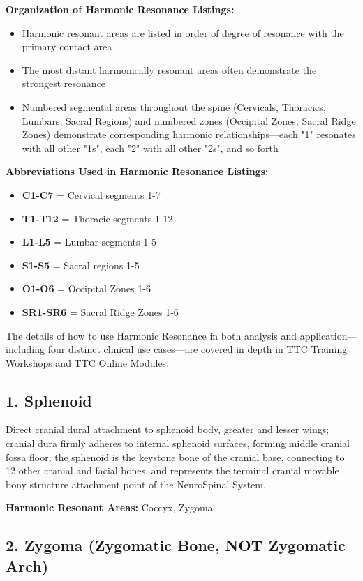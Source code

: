 \documentclass[11pt,letterpaper]{article}
\begin{document}
\textbf{Organization of Harmonic Resonance Listings:}


\begin{itemize}
\item Harmonic resonant areas are listed in order of degree of resonance with the primary contact area
\item The most distant harmonically resonant areas often demonstrate the strongest resonance
\item Numbered segmental areas throughout the spine (Cervicals, Thoracics, Lumbars, Sacral Regions) and numbered zones (Occipital Zones, Sacral Ridge Zones) demonstrate corresponding harmonic relationships—each "1" resonates with all other "1s", each "2" with all other "2s", and so forth
\end{itemize}

\textbf{Abbreviations Used in Harmonic Resonance Listings:}

\begin{itemize}
\item \textbf{C1-C7} = Cervical segments 1-7
\item \textbf{T1-T12} = Thoracic segments 1-12
\item \textbf{L1-L5} = Lumbar segments 1-5
\item \textbf{S1-S5} = Sacral regions 1-5
\item \textbf{O1-O6} = Occipital Zones 1-6
\item \textbf{SR1-SR6} = Sacral Ridge Zones 1-6
\end{itemize}

The details of how to use Harmonic Resonance in both analysis and application—including four distinct clinical use cases—are covered in depth in TTC Training Workshops and TTC Online Modules.


\subsection{1. Sphenoid}

Direct cranial dural attachment to sphenoid body, greater and lesser wings; cranial dura firmly adheres to internal sphenoid surfaces, forming middle cranial fossa floor; the sphenoid is the keystone bone of the cranial base, connecting to 12 other cranial and facial bones, and represents the terminal cranial movable bony structure attachment point of the NeuroSpinal System.


\textbf{Harmonic Resonant Areas:} Coccyx, Zygoma


\subsection{2. Zygoma (Zygomatic Bone, NOT Zygomatic Arch)}
\end{document}
